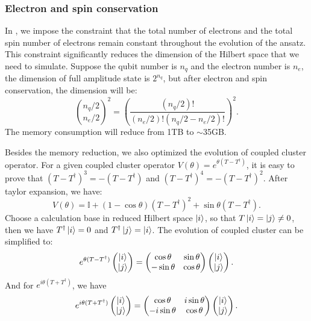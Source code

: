 \subsubsection{Electron and spin conservation}
In \QuPack, we impose the constraint that the total number of electrons and the total spin number of electrons remain constant throughout the evolution of the ansatz. This constraint significantly reduces the dimension of the Hilbert space that we need to simulate. Suppose the qubit number is $n_q$ and the electron number is $n_e$, the dimension of full amplitude state is $2^{n_q}$, but after electron and spin conservation, the dimension will be:
\begin{equation}
    \binom{n_q/2}{n_e/2}^2=\left(\frac{(n_q/2)!}{(n_e/2)!(n_q/2-n_e/2)!}\right)^2.
\end{equation}
The memory consumption will reduce from 1TB to $\sim$35GB.

Besides the memory reduction, we also optimized the evolution of coupled cluster operator. For a given coupled cluster operator $V(\theta)=e^{\theta(T-T^\dagger)}$, it is easy to prove that $(T-T^\dagger)^3 = - (T-T^\dagger)$ and $(T-T^\dagger)^4 = -(T-T^\dagger)^2$. After taylor expansion, we have:
\begin{equation}
    V(\theta) = \mathbb{I} + ( 1-\cos\theta)(T-T^\dagger)^2 + \sin\theta (T-T^\dagger).
\end{equation}
Choose a calculation base in reduced Hilbert space $\ket{i}$, so that $T\ket{i} = \ket{j}\neq0$, then we have $T^\dagger\ket{i}=0$ and $T^\dagger\ket{j}=\ket{i}$. The evolution of coupled cluster can be simplified to:
\begin{equation}
    e^{\theta(T-T^\dagger)}\begin{pmatrix}
        \ket{i} \\\ket{j}
    \end{pmatrix}=\begin{pmatrix}
        \cos\theta  & \sin\theta \\
        -\sin\theta & \cos\theta
    \end{pmatrix}\begin{pmatrix}
        \ket{i} \\\ket{j}
    \end{pmatrix}.
\end{equation}
And for $e^{i\theta(T+T^\dagger)}$, we have
\begin{equation}
    e^{i\theta(T+T^\dagger)}\begin{pmatrix}
        \ket{i} \\\ket{j}
    \end{pmatrix}=\begin{pmatrix}
        \cos\theta   & i\sin\theta \\
        -i\sin\theta & \cos\theta
    \end{pmatrix}\begin{pmatrix}
        \ket{i} \\\ket{j}
    \end{pmatrix}.
\end{equation}

